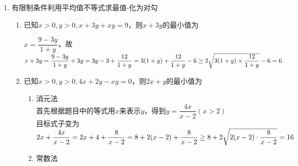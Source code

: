 \begin{enumerate}
\begin{enumerate}
        \item 已知正实数$a, b$满足$4a+3b = 1$，则$\dfrac{1}{2a+b} + \dfrac{1}{a+b}$的最小值是.
        \begin{jieda}
            $\dfrac{1}{2a+b} + \dfrac{1}{a+b} = \dfrac{1}{2a+b} + \dfrac{2}{2a+2b} = (\dfrac{1}{2a+b} + \dfrac{2}{2a+2b}) \times (2a + b + 2a + 2b) = 1 + 2 + \dfrac{2a+2b}{a+b} + \dfrac{2(2a+b)}{2a+2b} \geq 3+2\sqrt{2}$，当且仅当$a = \dfrac{3\sqrt{2}}{2}-2, b = 3-2\sqrt{2}$时取等号. 
        \end{jieda}
        \item 已知正实数$m, n$满足$\dfrac{1}{m+2n} + \dfrac{1}{2m+n} = 1$，则$m+n$的最小值为
        \begin{jieda}
            $m+n = \dfrac{(m+2n) + (2m+n)}{3} = \dfrac{1}{3}[(m+2n) + (2m+n)] \cdot(\dfrac{1}{m+2n} + \dfrac{1}{2m+n}) \\
            = \dfrac{1}{3}(2 + \dfrac{2m+n}{m+2n} + \dfrac{m+2n}{2m+n}) \geq \dfrac{1}{3}(2 + 2\sqrt{1}) = \dfrac{4}{3}$（当$m = n = \dfrac{2}{3}$时取等号）
        \end{jieda}
    \end{enumerate}
    \item 有限制条件利用平均值不等式求最值-化为对勾
    \begin{enumerate}
        \item 已知$x>0, y>0, x+3y+xy=9$，则$x+3y$的最小值为
        \begin{jieda}
            $x = \dfrac{9-3y}{1+y}$，故$x+3y = \dfrac{9-3y}{1+y} + 3y = 3y - 3 + \dfrac{12}{1+y} = 3(1+y) + \dfrac{12}{1+y} - 6 \\
            \geq 2\sqrt{3(1+y) \times \dfrac{12}{1+y}} - 6 = 6$
        \end{jieda}
        \item 已知$x > 0, y > 0, 4x+2y-xy=0$，则$2x+y$的最小值为
        \begin{jieda}
            \begin{enumerate}
                \item 消元法 \\
                首先根据题目中的等式用$x$来表示$y$，得到$y = \dfrac{4x}{x-2} (x > 2)$ \\
                目标式子变为$2x+\dfrac{4x}{x-2} = 2x + 4 + \dfrac{8}{x-2} = 8 + 2(x-2) + \dfrac{8}{x-2} \geq 8 + 2 \sqrt{2(x-2) \cdot \dfrac{8}{x-2}} \\ = 16$
                \item 常数法 \\

\end{enumerate}
\end{jieda}
\end{enumerate}
\end{enumerate}
